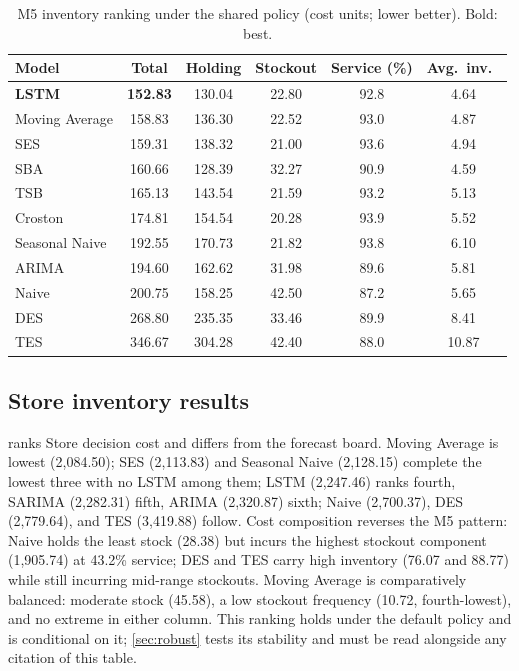 \begin{table}[H]
\centering
\caption{M5 inventory ranking under the shared policy (cost units; lower better). Bold: best.}
\label{tab:m5inv}
\begin{tabular}{lccccc}
\toprule
Model & Total & Holding & Stockout & Service (\%) & Avg.\ inv.\ \\
\midrule
\textbf{LSTM} & \textbf{152.83} & 130.04 & 22.80 & 92.8 & 4.64 \\
Moving Average & 158.83 & 136.30 & 22.52 & 93.0 & 4.87 \\
SES & 159.31 & 138.32 & 21.00 & 93.6 & 4.94 \\
SBA & 160.66 & 128.39 & 32.27 & 90.9 & 4.59 \\
TSB & 165.13 & 143.54 & 21.59 & 93.2 & 5.13 \\
Croston & 174.81 & 154.54 & 20.28 & 93.9 & 5.52 \\
Seasonal Naive & 192.55 & 170.73 & 21.82 & 93.8 & 6.10 \\
ARIMA & 194.60 & 162.62 & 31.98 & 89.6 & 5.81 \\
Naive & 200.75 & 158.25 & 42.50 & 87.2 & 5.65 \\
DES & 268.80 & 235.35 & 33.46 & 89.9 & 8.41 \\
TES & 346.67 & 304.28 & 42.40 & 88.0 & 10.87 \\
\bottomrule
\end{tabular}
\end{table}

\subsection{Store inventory results}
\label{sec:store-inv}
 ranks Store decision cost and differs from the forecast
board. Moving Average is lowest (2,084.50); SES (2,113.83) and Seasonal Naive
(2,128.15) complete the lowest three with no LSTM among them; LSTM (2,247.46)
ranks fourth, SARIMA (2,282.31) fifth, ARIMA (2,320.87) sixth; Naive
(2,700.37), DES (2,779.64), and TES (3,419.88) follow. Cost composition
reverses the M5 pattern: Naive holds the least stock (28.38) but incurs the
highest stockout component (1,905.74) at 43.2\% service; DES and TES carry
high inventory (76.07 and 88.77) while still incurring mid-range stockouts.
Moving Average is comparatively balanced: moderate stock (45.58), a low
stockout frequency (10.72, fourth-lowest), and no extreme in either column. This ranking
holds under the default policy and is conditional on it; \cref{sec:robust}
tests its stability and must be read alongside any citation of this table.

